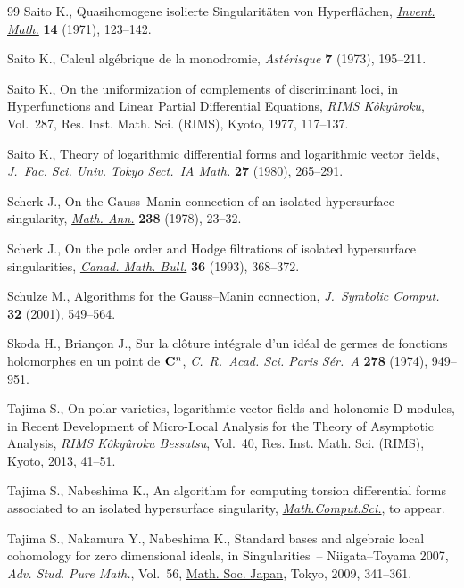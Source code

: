\begin{thebibliography}{99}
Saito K., Quasihomogene isolierte {S}ingularit\"aten von {H}yperfl\"achen,
 \href{https://doi.org/10.1007/BF01405360}{\textit{Invent. Math.}} \textbf{14} (1971), 123--142.

Saito K., Calcul alg\'ebrique de la monodromie, \textit{Ast\'erisque}
 \textbf{7} (1973), 195--211.

Saito K., On the uniformization of complements of discriminant loci, in
 Hyperfunctions and Linear Partial Differential Equations, \textit{RIMS
 K\^oky\^uroku}, Vol.~287, Res. Inst. Math. Sci. (RIMS), Kyoto, 1977,
 117--137.

Saito K., Theory of logarithmic differential forms and logarithmic vector
 fields, \textit{J.~Fac. Sci. Univ. Tokyo Sect.~IA Math.} \textbf{27} (1980),
 265--291.

Scherk J., On the {G}auss--{M}anin connection of an isolated hypersurface
 singularity, \href{https://doi.org/10.1007/BF01351450}{\textit{Math. Ann.}} \textbf{238} (1978), 23--32.

Scherk J., On the pole order and {H}odge filtrations of isolated hypersurface
 singularities, \href{https://doi.org/10.4153/CMB-1993-050-9}{\textit{Canad. Math. Bull.}} \textbf{36} (1993), 368--372.

Schulze M., Algorithms for the {G}auss--{M}anin connection, \href{https://doi.org/10.1006/jsco.2001.0482}{\textit{J.~Symbolic
 Comput.}} \textbf{32} (2001), 549--564.

Skoda H., Briançon J., Sur la cl\^oture int\'egrale d'un id\'eal de germes
 de fonctions holomorphes en un point de {${\bf C}^{n}$}, \textit{C.~R.~Acad.
 Sci. Paris S\'er.~A} \textbf{278} (1974), 949--951.

Tajima S., On polar varieties, logarithmic vector fields and holonomic
 {D}-modules, in Recent Development of Micro-Local Analysis for the Theory of
 Asymptotic Analysis, \textit{RIMS K\^oky\^uroku Bessatsu}, Vol.~40, Res.
 Inst. Math. Sci. (RIMS), Kyoto, 2013, 41--51.

Tajima S., Nabeshima K., An algorithm for computing torsion differential forms
 associated to an isolated hypersurface singularity, \href{https://doi.org/10.1007/s11786-020-00486-w}{\textit{Math.Comput.Sci.}},
 {t}o appear.

Tajima S., Nakamura Y., Nabeshima K., Standard bases and algebraic local
 cohomology for zero dimensional ideals, in Singularities~--
 {N}iigata--{T}oyama 2007, \textit{Adv. Stud. Pure Math.}, Vol.~56, \href{https://doi.org/10.2969/aspm/05610341}{Math. Soc.
 Japan}, Tokyo, 2009, 341--361.


\end{thebibliography}
